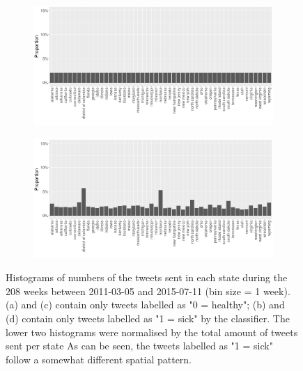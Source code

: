 \documentclass[11pt, a4paper]{article}\usepackage[]{graphicx}\usepackage[]{color}
\begin{document}
\begin{figure}[h]
    \begin{subfigure}[t]{0.49\textwidth}
  \includegraphics[width=1\linewidth]{activity_rel_healthy_statename_Twitter_full_aggregated.png}
  \caption{}
  \end{subfigure}
  \hfill
    \begin{subfigure}[t]{0.49\textwidth}
  \includegraphics[width=1\linewidth]{activity_rel_sick_statename_Twitter_full_aggregated.png}
  \caption{}
  \end{subfigure}
  \caption{Histograms of numbers of the tweets sent in each state during the 208 weeks between 2011-03-05 and 2015-07-11 (bin size = 1 week). (a) and (c) contain only tweets labelled as "0 = healthy"; (b) and (d) contain only tweets labelled as "1 = sick" by the classifier. The lower two histograms were normalised by the total amount of tweets sent per state As can be seen, the tweets labelled as "1 = sick" follow a somewhat different spatial pattern.}
  \label{fig:tweets_state_healthy_sick}
\end{figure}
\end{document}
